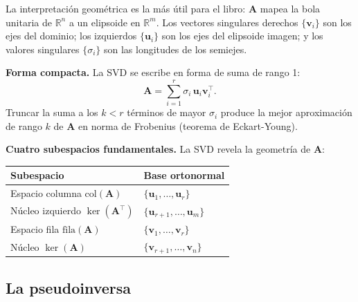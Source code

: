 La interpretación geométrica es la más útil para el libro: $\bm{A}$ mapea la
bola unitaria de $\mathbb{R}^n$ a un elipsoide en $\mathbb{R}^m$. Los vectores
singulares derechos $\{\bm{v}_i\}$ son los ejes del dominio; los izquierdos
$\{\bm{u}_i\}$ son los ejes del elipsoide imagen; y los valores singulares
$\{\sigma_i\}$ son las longitudes de los semiejes.

\medskip\noindent\textbf{Forma compacta.} La SVD se escribe en forma de suma de
rango 1:
\begin{equation}
  \bm{A} = \sum_{i=1}^r \sigma_i\,\bm{u}_i\bm{v}_i^\top.
  \label{eq:ap_svd_suma}
\end{equation}
Truncar la suma a los $k < r$ términos de mayor $\sigma_i$ produce la mejor
aproximación de rango $k$ de $\bm{A}$ en norma de Frobenius (teorema de
Eckart-Young).

\medskip\noindent\textbf{Cuatro subespacios fundamentales.} La SVD revela la
geometría de $\bm{A}$:
\begin{center}
\begin{tabular}{ll}
\toprule
\textbf{Subespacio} & \textbf{Base ortonormal} \\
\midrule
Espacio columna $\mathrm{col}(\bm{A})$ & $\{\bm{u}_1,\ldots,\bm{u}_r\}$ \\
Núcleo izquierdo $\ker(\bm{A}^\top)$ & $\{\bm{u}_{r+1},\ldots,\bm{u}_m\}$ \\
Espacio fila $\mathrm{fila}(\bm{A})$ & $\{\bm{v}_1,\ldots,\bm{v}_r\}$ \\
Núcleo $\ker(\bm{A})$ & $\{\bm{v}_{r+1},\ldots,\bm{v}_n\}$ \\
\bottomrule
\end{tabular}
\end{center}

\subsection{La pseudoinversa}
\label{subsec:ap_pseudoinversa}

